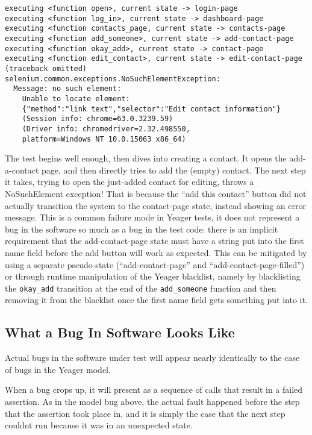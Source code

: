 \begin{Verbatim}[fontsize=\small]
executing <function open>, current state -> login-page
executing <function log_in>, current state -> dashboard-page
executing <function contacts_page, current state -> contacts-page
executing <function add_someone>, current state -> add-contact-page
executing <function okay_add>, current state -> contact-page
executing <function edit_contact>, current state -> edit-contact-page
(traceback omitted)
selenium.common.exceptions.NoSuchElementException:
  Message: no such element:
    Unable to locate element:
    {"method":"link text","selector":"Edit contact information"}
    (Session info: chrome=63.0.3239.59)
    (Driver info: chromedriver=2.32.498550,
    platform=Windows NT 10.0.15063 x86_64)
\end{Verbatim}

The test begins well enough, then dives into creating a contact. It opens the add-a-contact page, and then directly tries to add the (empty) contact. The next step it takes, trying to open the just-added contact for editing, throws a NoSuchElement exception! That is because the  ``add this contact'' button did not actually transition the system to the contact-page state, instead showing an error message. This is a common failure mode in Yeager tests, it does not represent a bug in the software so much as a bug in the test code: there is an implicit requirement that the add-contact-page state must have a string put into the first name field before the add button will work as expected. This can be mitigated by using a separate pseudo-state (``add-contact-page'' and ``add-contact-page-filled'') or through runtime manipulation of the Yeager blacklist, namely by blacklisting the \texttt{okay\_add} transition at the end of the \texttt{add\_someone} function and then removing it from the blacklist once the first name field gets something put into it.

\subsection{What a Bug In Software Looks Like}
Actual bugs in the software under test will appear nearly identically to the case of bugs in the Yeager model.

When a bug crops up, it will present as a sequence of calls that result in a failed assertion. As in the model bug above, the actual fault happened before the step that the assertion took place in, and it is simply the case that the next step couldnt run because it was in an unexpected state.

